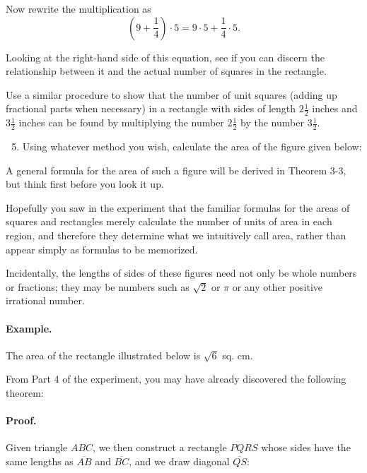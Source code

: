 \documentclass[12pt]{book} %
\begin{document}
Now rewrite the multiplication as
\[
\left(9+\frac14\right)\cdot 5=9\cdot 5+\frac14\cdot 5.
\]

Looking at the right-hand side of this equation, see if you can discern the relationship between it and the actual number of squares in the rectangle.

Use a similar procedure to show that the number of unit squares (adding up fractional parts when necessary) in a rectangle with sides of length $2\frac12$ inches and $3\frac12$ inches can be found by multiplying the number $2\frac12$ by the number $3\frac12$.

\begin{enumerate}
\setcounter{enumi}{4}
\item Using whatever method you wish, calculate the area of the figure given below:

\end{enumerate}

A general formula for the area of such a figure will be derived in Theorem 3-3, but think first before you look it up.

Hopefully you saw in the experiment that the familiar formulas for the areas of squares and rectangles merely calculate the number of units of area in each region, and therefore they determine what we intuitively call area, rather than appear simply as formulas to be memorized.

Incidentally, the lengths of sides of these figures need not only be whole numbers or fractions; they may be numbers such as $\sqrt{2}$ or $\pi$ or any other positive irrational number.

\paragraph{Example.}
The area of the rectangle illustrated below is $\sqrt{6}$ sq. cm.


From Part 4 of the experiment, you may have already discovered the following theorem:



\paragraph{Proof.}
Given triangle $ABC$, we then construct a rectangle $PQRS$ whose sides have the same lengths as $\overline{AB}$ and $\overline{BC}$, and we draw diagonal $\overline{QS}$:
\end{document}
